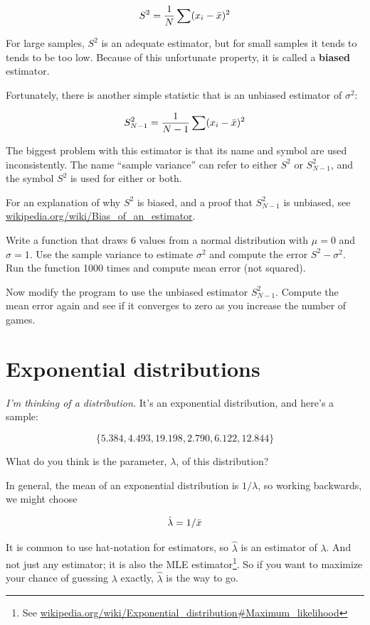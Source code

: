\documentclass[12pt]{book}
\begin{document}
\[ S^2 = \frac{1}{N} \sum (x_i - \bar{x})^2 \] 

For large samples, $S^2$ is an adequate estimator, but for small
samples it tends to tends to be too low.  Because of this unfortunate
property, it is called a {\bf biased} estimator.

Fortunately, there is another simple statistic that is an unbiased
estimator of $\sigma^2$:

\[ S_{N-1}^2 = \frac{1}{N-1} \sum (x_i - \bar{x})^2 \] 

The biggest problem with this estimator is that its name and symbol
are used inconsistently.  The name ``sample variance'' can refer to
either $S^2$ or $S_{N-1}^2$, and the symbol $S^2$ is used
for either or both.

For an explanation of why $S^2$ is biased, and a proof that
$S_{N-1}^2$ is unbiased, see
\url{wikipedia.org/wiki/Bias_of_an_estimator}.

\begin{ex}

Write a function that draws 6 values from a normal distribution with
$\mu=0$ and $\sigma=1$.  Use the sample variance to estimate
$\sigma^2$ and compute the error $S^2 - \sigma^2$.  Run the function 1000
times and compute mean error (not squared).

Now modify the program to use the unbiased estimator $S_{N-1}^2$.
Compute the mean error again and see if it converges to zero as you
increase the number of games.

\end{ex}

\section{Exponential distributions}

{\em I'm thinking of a distribution.}  It's an exponential distribution, and 
here's a sample:

\[ \{ 5.384, 4.493, 19.198, 2.790, 6.122, 12.844 \} \]

What do you think is the parameter, $\lambda$, of this distribution?

\newcommand{\lamhat}{\hat{\lambda}}
\newcommand{\lamhatmed}{\hat{\lambda}_{1/2}}

In general, the mean of an exponential distribution is $1 / \lambda$,
so working backwards, we might choose

\[ \lamhat = 1 / \xbar \]

It is common to use hat-notation for estimators, so $\lamhat$ is an
estimator of $\lambda$.  And not just any estimator; it is also the
MLE estimator\footnote{See
\url{wikipedia.org/wiki/Exponential_distribution#Maximum_likelihood}}.
So if you want to maximize your chance of guessing $\lambda$ exactly,
$\lamhat$ is the way to go.
\end{document}
